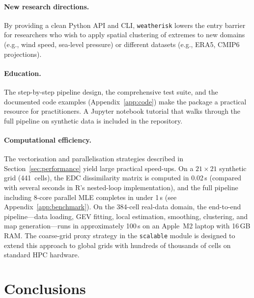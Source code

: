 \documentclass[preprint,12pt,a4paper]{elsarticle}
\begin{document}
\paragraph{New research directions.}
By providing a clean Python API and CLI, \texttt{weatherisk} lowers
the entry barrier for researchers who wish to apply spatial
clustering of extremes to new domains (e.g., wind speed, sea-level
pressure) or different datasets (e.g., ERA5, CMIP6 projections).


\paragraph{Education.}
The step-by-step pipeline design, the comprehensive test suite,
and the documented code examples (Appendix~\ref{app:code}) make
the package a practical resource for practitioners.  A Jupyter notebook tutorial
that walks through the full pipeline on synthetic data is
included in the repository.

\paragraph{Computational efficiency.}
The vectorisation and parallelisation strategies described in
Section~\ref{sec:performance} yield large practical speed-ups.
On a $21 \times 21$ synthetic grid (441~cells), the EDC
dissimilarity matrix is computed in 0.02\,s (compared with
several seconds in R's nested-loop implementation), and the
full pipeline including 8-core parallel MLE completes in under
1\,s (see Appendix~\ref{app:benchmark}).  On the 384-cell
real-data domain, the end-to-end pipeline---data loading, GEV
fitting, local estimation, smoothing, clustering, and map
generation---runs in approximately 100\,s on an Apple~M2 laptop
with 16\,GB RAM.  The coarse-grid proxy strategy in the
\texttt{scalable} module is designed to extend this approach to
global grids with hundreds of thousands of cells on standard
HPC hardware.

\section{Conclusions}
\label{sec:conclusions}
\end{document}
